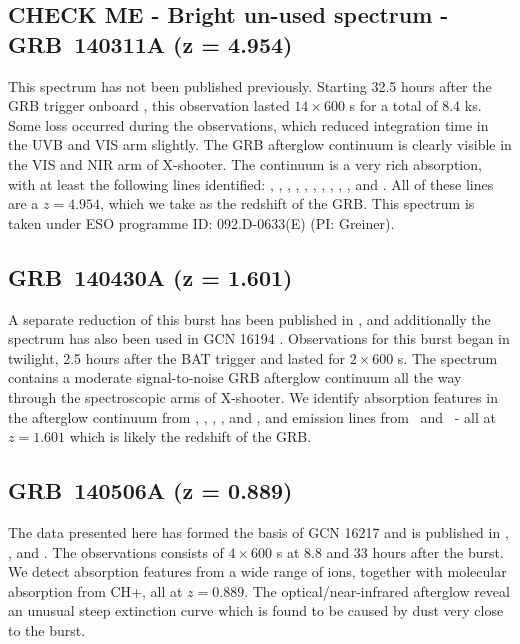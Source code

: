 \documentclass{aa}    %
\begin{document}
\subsection{CHECK ME - Bright un-used spectrum - GRB~140311A (z = 4.954)}	
\label{140311}

This spectrum has not been published previously. Starting 32.5 hours after the
GRB trigger onboard \swift, this observation lasted $14\times600$ s for a total
of 8.4 ks. Some loss occurred during the observations, which reduced integration
time in the UVB and VIS arm slightly. The GRB afterglow continuum is clearly
visible in the VIS and NIR arm of X-shooter. The continuum is a very rich
absorption, with at least the following lines identified: \lyg, \lyb, \lya,
\SIii, \SIiv, \civ, \alii, \aliii, \feii, \mgii, and \mgi. All of these lines
are a $z = 4.954$, which we take as the redshift of the GRB. This spectrum is
taken under ESO programme ID: 092.D-0633(E) (PI: Greiner).

\subsection{GRB~140430A (z = 1.601)}\label{140430}

A separate reduction of this burst has been published in \citet{Kruhler2015},
and additionally the spectrum has also been used in GCN 16194 \citep{GCN16194}.
Observations for this burst began in twilight, 2.5 hours after the BAT trigger
and lasted for $2\times600$ s. The spectrum contains a moderate signal-to-noise
GRB afterglow continuum all the way through the spectroscopic arms of X-shooter.
We identify absorption features in the afterglow continuum from \SIii, \civ,
\alii, \feii, and \mgii, and emission lines from \oii~and \oiii~- all at $z =
1.601$ which is likely the redshift of the GRB.

\subsection{GRB~140506A  (z = 0.889)} \label{140506}

The data presented here has formed the basis of GCN 16217 \citep{GCN16217} and
is published in \citet{Fynbo2014}, \citet{Kruhler2015}, and \citet{Heintz2017a}.
The observations consists of $4\times 600$ s at 8.8 and 33 hours after the
burst. We detect absorption features from a wide range of ions, together with
molecular absorption from CH+, all at $z=0.889$. The optical/near-infrared
afterglow reveal an unusual steep extinction curve which is found to be caused
by dust very close to the burst.
\end{document}
